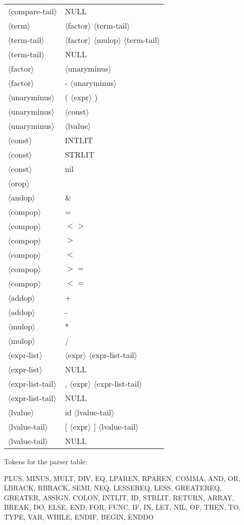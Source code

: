 \documentclass[11pt, fleqn]{article}
\newcommand{\atag}[1]{$\langle$#1$\rangle$}
\begin{document}
\begin{longtable}{l|l}
\atag{compare-tail}				&	NULL	\\
\atag{term} 						&	\atag{factor} \atag{term-tail}		\\
\atag{term-tail}					&	\atag{factor} \atag{mulop} \atag{term-tail}	\\
\atag{term-tail}					&	NULL	\\
\atag{factor}					&	\atag{unaryminus}		\\
\atag{factor}					&	- \atag{unaryminus}		\\
\atag{unaryminus}				&	( \atag{expr} )		\\
\atag{unaryminus}				&	\atag{const}		\\
\atag{unaryminus}				&	\atag{lvalue}		\\
\atag{const}						&	INTLIT		\\
\atag{const}						&	STRLIT		\\
\atag{const}						&	nil		\\
\atag{orop} 						&	\textbar		\\
\atag{andop}						&	\&		\\
\atag{compop}					&	=		\\
\atag{compop}					&	$<>$		\\
\atag{compop}					&	$>$		\\
\atag{compop}					&	$<$		\\
\atag{compop}					&	$>=$		\\
\atag{compop}					&	$<=$		\\
\atag{addop}						&	+		\\
\atag{addop}						&	-		\\
\atag{mulop}						&	*		\\
\atag{mulop}						&	/		\\
\atag{expr-list}					&	\atag{expr} \atag{expr-list-tail}		\\
\atag{expr-list}					&	NULL		\\
\atag{expr-list-tail}			&	, \atag{expr} \atag{expr-list-tail}		\\
\atag{expr-list-tail}			&	NULL		\\
\atag{lvalue}					&	id \atag{lvalue-tail}		\\
\atag{lvalue-tail}				&	[ \atag{expr} ] \atag{lvalue-tail}		\\
\atag{lvalue-tail}				&	NULL		\\
\end{longtable}


Tokens for the parser table:

PLUS, MINUS, MULT, DIV, EQ, LPAREN, RPAREN, COMMA, AND, OR, LBRACK, RBRACK, SEMI, NEQ, LESSEREQ, LESS, GREATEREQ, GREATER, ASSIGN, COLON, INTLIT, ID, STRLIT, RETURN, ARRAY, BREAK, DO, ELSE, END, FOR, FUNC, IF, IN, LET, NIL, OF, THEN, TO, TYPE, VAR, WHILE, ENDIF, BEGIN, ENDDO
\end{document}
